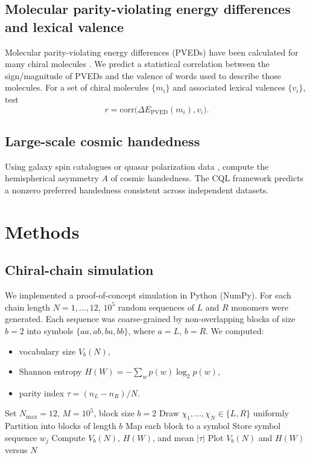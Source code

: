 \documentclass[11pt,a4paper]{article}
\begin{document}
\subsection{Molecular parity-violating energy differences and lexical valence}

Molecular parity-violating energy differences (PVEDs) have been calculated for many chiral molecules \cite{hegstrom80, quack02}. We predict a statistical correlation between the sign/magnitude of PVEDs and the valence of words used to describe those molecules. For a set of chiral molecules $\{m_i\}$ and associated lexical valences $\{v_i\}$, test
\begin{equation}
r = \mathrm{corr}\bigl(\Delta E_{\mathrm{PVED}}(m_i), v_i\bigr).
\end{equation}

\subsection{Large-scale cosmic handedness}

Using galaxy spin catalogues \cite{longo11} or quasar polarization data \cite{hutsemekers05}, compute the hemispherical asymmetry $A$ of cosmic handedness. The CQL framework predicts a nonzero preferred handedness consistent across independent datasets.

\section{Methods}

\subsection{Chiral-chain simulation}

We implemented a proof-of-concept simulation in Python (NumPy). For each chain length $N=1,\dots,12$, $10^5$ random sequences of $L$ and $R$ monomers were generated. Each sequence was coarse-grained by non-overlapping blocks of size $b=2$ into symbols $\{aa, ab, ba, bb\}$, where $a=L$, $b=R$. We computed:
\begin{itemize}
\item vocabulary size $V_b(N)$,
\item Shannon entropy $H(W) = -\sum_w p(w)\log_2 p(w)$,
\item parity index $\tau = (n_L - n_R)/N$.
\end{itemize}

\begin{algorithm}
\caption{Chiral-chain coarse-graining simulation}
\begin{algorithmic}[1]
\State Set $N_{\max}=12$, $M=10^5$, block size $b=2$
\State Draw $\chi_1,\dots,\chi_N \in \{L,R\}$ uniformly
\State Partition into blocks of length $b$
\State Map each block to a symbol
\State Store symbol sequence $w_j$
\EndFor
\State Compute $V_b(N)$, $H(W)$, and mean $|\tau|$
\EndFor
\State Plot $V_b(N)$ and $H(W)$ versus $N$
\end{algorithmic}
\end{algorithm}
\end{document}
